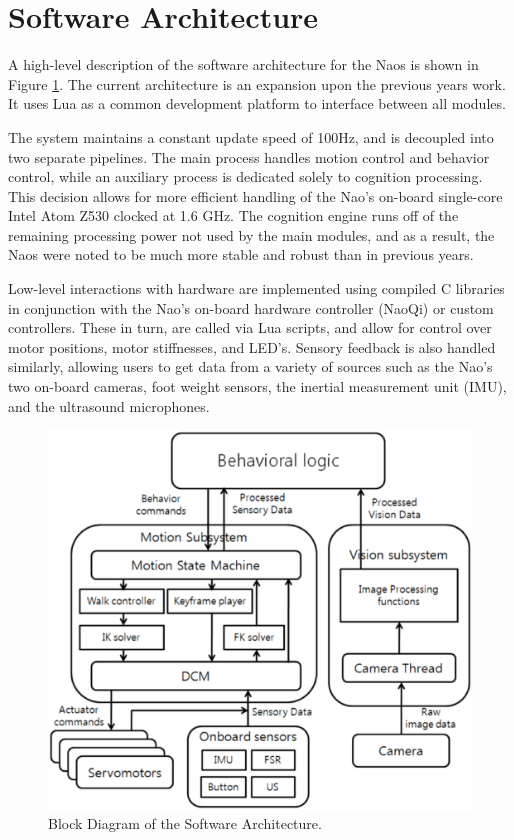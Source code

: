 \documentclass{article}
\begin{document}
\section{Software Architecture}
	A high-level description of the software architecture for the Naos is shown in Figure \ref{fig:softarch}. The current architecture is an expansion upon the previous years work. It uses Lua as a common development platform to interface between all modules.

	The system maintains a constant update speed of 100Hz, and is decoupled into two separate pipelines. The main process handles motion control and behavior control, while an auxiliary process is dedicated solely to cognition processing. This decision allows for more efficient handling of the Nao's on-board single-core Intel Atom Z530 clocked at 1.6 GHz. The cognition engine runs off of the remaining processing power not used by the main modules, and as a result, the Naos were noted to be much more stable and robust than in previous years.

	Low-level interactions with hardware are implemented using compiled C libraries in conjunction with the Nao's on-board hardware controller (NaoQi) or custom controllers. These in turn, are called via Lua scripts, and allow for control over motor positions, motor stiffnesses, and LED's. Sensory feedback is also handled similarly, allowing users to get data from a variety of sources such as the Nao's two on-board cameras, foot weight sensors, the inertial measurement unit (IMU), and the ultrasound microphones.

	\begin{figure}[H]
		\centering
		\includegraphics[width=1.0\textwidth]{figures/SoftArchOverview.eps}
		\caption{Block Diagram of the Software Architecture.}
		\label{fig:softarch}
	\end{figure}
\end{document}
